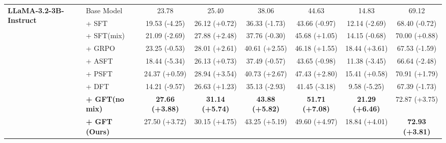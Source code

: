 \begin{table}[!t]
{\begin{tabular}{llcccccc}
            \multirow{9}{*}{\textbf{LLaMA-3.2-3B-Instruct}} 
            & Base Model & 23.78 & 25.40 & 38.06 & 44.63 & 14.83 & 69.12 \\
            & + SFT & 19.53 (-4.25) & 26.12 (+0.72) & 36.33 (-1.73) & 43.66 (-0.97) & 12.14 (-2.69) & 68.40 (-0.72) \\
            & + SFT(mix) & 21.09 (-2.69) & 27.88 (+2.48) & 37.76 (-0.30) & 45.68 (+1.05) & 14.15 (-0.68) & 70.00 (+0.88) \\
            & + GRPO & 23.25 (-0.53) & 28.01 (+2.61) & 40.61 (+2.55) & 46.18 (+1.55) & 18.44 (+3.61) & 67.53 (-1.59) \\
            & + ASFT & 18.44 (-5.34) & 26.13 (+0.73) & 37.49 (-0.57) & 43.65 (-0.98) & 11.38 (-3.45) & 66.64 (-2.48) \\
            & + PSFT & 24.37 (+0.59) & 28.94 (+3.54) & 40.73 (+2.67) & 47.43 (+2.80) & 15.41 (+0.58) & 70.91 (+1.79) \\
            & + DFT & 14.21 (-9.57) & 26.63 (+1.23) & 35.13 (-2.93) & 41.45 (-3.18) & 9.58 (-5.25) & 67.39 (-1.73) \\
            \cmidrule(l){2-8}
            & \textbf{+ GFT(no mix)} & \cellcolor{blue!10}\textbf{27.66 (+3.88)} & \cellcolor{blue!10}\textbf{31.14 (+5.74)} & \cellcolor{blue!10}\textbf{43.88 (+5.82)} & \cellcolor{blue!10}\textbf{51.71 (+7.08)} & \cellcolor{blue!10}\textbf{21.29 (+6.46)} & 72.87 (+3.75) \\
            & \textbf{+ GFT (Ours)} & 27.50 (+3.72) & 30.15 (+4.75) & 43.25 (+5.19) & 49.60 (+4.97) & 18.84 (+4.01) & \cellcolor{blue!10}\textbf{72.93 (+3.81)} \\
            \bottomrule
        \end{tabular}%
    }
\end{table}


